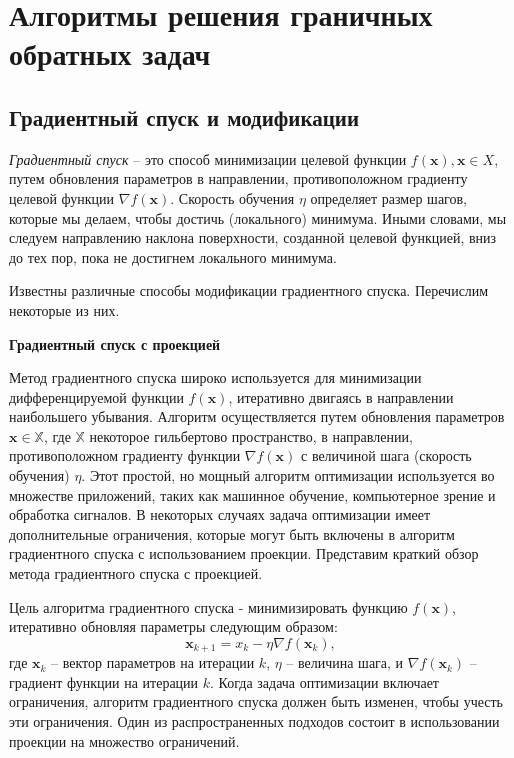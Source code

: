 \section{Алгоритмы решения граничных обратных задач}\label{sec:ch4/sec3}


\subsection{Градиентный спуск и модификации}
\label{subsec:ch4/sec3/grad}
\textit{Градиентный спуск} -- это способ минимизации целевой функции
$f(\mathbf{x}), \mathbf{x} \in X$, путем обновления параметров
в направлении, противоположном градиенту целевой функции
$\nabla f(\mathbf{x})$.
Скорость обучения $\eta$ определяет размер шагов, которые мы делаем,
чтобы достичь (локального) минимума.
Иными словами, мы следуем направлению наклона поверхности,
созданной целевой функцией, вниз до тех пор,
пока не достигнем локального минимума.

Известны различные способы модификации градиентного спуска.
Перечислим некоторые из них.

\textbf{Градиентный спуск с проекцией}

Метод градиентного спуска широко используется для минимизации дифференцируемой
функции $f(\mathbf{x})$, итеративно двигаясь в направлении наибольшего убывания.
Алгоритм осуществляется путем обновления параметров
$\mathbf{x} \in \mathbb{X}$, где $\mathbb{X}$ некоторое гильбертово пространство,
в направлении, противоположном
градиенту функции $\nabla f(\mathbf{x})$ с величиной шага
(скорость обучения) $\eta$.
Этот простой, но мощный алгоритм оптимизации используется во
множестве приложений, таких как машинное обучение, компьютерное
зрение и обработка сигналов.
В некоторых случаях задача оптимизации
имеет дополнительные ограничения, которые могут быть включены в
алгоритм градиентного спуска с использованием проекции.
Представим краткий обзор метода градиентного спуска с проекцией.


Цель алгоритма градиентного спуска - минимизировать функцию
$f(\mathbf{x})$, итеративно обновляя параметры следующим образом:
\[ \mathbf{x}_{k+1} = x_k - \eta \nabla f(\mathbf{x}_k), \]
где $\mathbf{x}_k$ -- вектор параметров на итерации $k$,
$\eta$ -- величина шага, и $\nabla f(\mathbf{x}_k)$ -- градиент
функции на итерации $k$.
Когда задача оптимизации включает ограничения, алгоритм
градиентного спуска должен быть изменен, чтобы учесть эти ограничения.
Один из распространенных подходов состоит в использовании проекции
на множество ограничений.


